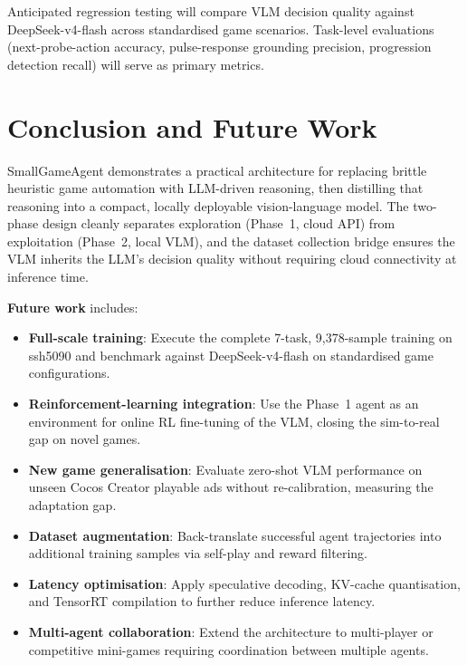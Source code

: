 \documentclass[11pt,a4paper]{article}
\begin{document}
Anticipated regression testing will compare VLM decision quality against DeepSeek-v4-flash across standardised game scenarios. Task-level evaluations (next-probe-action accuracy, pulse-response grounding precision, progression detection recall) will serve as primary metrics.

\section{Conclusion and Future Work}

SmallGameAgent demonstrates a practical architecture for replacing brittle heuristic game automation with LLM-driven reasoning, then distilling that reasoning into a compact, locally deployable vision-language model. The two-phase design cleanly separates exploration (Phase~1, cloud API) from exploitation (Phase~2, local VLM), and the dataset collection bridge ensures the VLM inherits the LLM's decision quality without requiring cloud connectivity at inference time.

\textbf{Future work} includes:

\begin{itemize}[leftmargin=*,itemsep=2pt]
  \item \textbf{Full-scale training}: Execute the complete 7-task, 9,378-sample training on ssh5090 and benchmark against DeepSeek-v4-flash on standardised game configurations.
  \item \textbf{Reinforcement-learning integration}: Use the Phase~1 agent as an environment for online RL fine-tuning of the VLM, closing the sim-to-real gap on novel games.
  \item \textbf{New game generalisation}: Evaluate zero-shot VLM performance on unseen Cocos Creator playable ads without re-calibration, measuring the adaptation gap.
  \item \textbf{Dataset augmentation}: Back-translate successful agent trajectories into additional training samples via self-play and reward filtering.
  \item \textbf{Latency optimisation}: Apply speculative decoding, KV-cache quantisation, and TensorRT compilation to further reduce inference latency.
  \item \textbf{Multi-agent collaboration}: Extend the architecture to multi-player or competitive mini-games requiring coordination between multiple agents.
\end{itemize}
\end{document}
